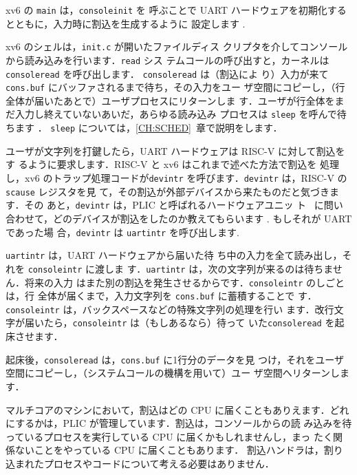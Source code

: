 xv6 の \texttt{main} は，\texttt{consoleinit} 
 を
呼ぶことで UART ハードウェアを初期化するとともに，入力時に割込を生成するように
設定します .

xv6 のシェルは，\texttt{init.c}
 が開いたファイルディス
クリプタを介してコンソールから読み込みを行います．\texttt{read} シス
テムコールの呼び出すと，カーネルは\texttt{consoleread}
 を呼び出します．
\texttt{consoleread} は（割込によ
り）入力が来て\texttt{cons.buf} にバッファされるまで待ち，その入力をユー
ザ空間にコピーし，（行全体が届いたあとで）ユーザプロセスにリターンしま
す．ユーザが行全体をまだ入力し終えていないあいだ，あらゆる読み込み
プロセスは \texttt{sleep} を呼んで待ちます
．
\texttt{sleep} については，\ref{CH:SCHED}~章で説明をします．

ユーザが文字列を打鍵したら，UART ハードウェアは RISC-V に対して割込をす
るように要求します．RISC-V と xv6 はこれまで述べた方法で割込を
処理し，xv6 のトラップ処理コードが\texttt{devintr}
を呼びます．\texttt{devintr} は，RISC-V の \texttt{scause} レジスタを見
て，その割込が外部デバイスから来たものだと気づきます．その
あと，\texttt{devintr} は，PLIC と呼ばれるハードウェアユニッ
ト~\cite{riscv:priv} に問い合わせて，どのデバイスが割込をしたのか教えてもらいます
. 
もしそれが UART であった場
合，\texttt{devintr} は \texttt{uartintr} を呼び出します.


\texttt{uartintr}
は，UART ハードウェアから届いた待
ち中の入力を全て読み出し，それを \texttt{consoleintr} に渡しま
す．\texttt{uartintr} は，次の文字列が来るのは待ちません．将来の入力
はまた別の割込を発生させるからです．\texttt{consoleintr} のしごとは，行
全体が届くまで，入力文字列を \texttt{cons.buf} に蓄積することで
す．\texttt{consoleintr} は，バックスペースなどの特殊文字列の処理を行い
ます．改行文字が届いたら，\texttt{consoleintr} は（もしあるなら）待って
いた\texttt{consoleread} を起床させます．

起床後，\texttt{consoleread} は，\texttt{cons.buf} に1行分のデータを見
つけ，それをユーザ空間にコピーし，（システムコールの機構を用いて）ユー
ザ空間へリターンします．

マルチコアのマシンにおいて，割込はどの CPU に届くこともありえます．どれ
にするかは，PLIC が管理しています．割込は，コンソールからの読
み込みを待っているプロセスを実行している CPU に届くかもしれませんし，まっ
たく関係ないことをやっている CPU に届くこともあります．
割込ハンドラは，割り込まれたプロセスやコードについて考える必要はありません．

